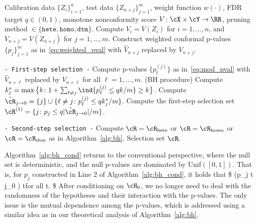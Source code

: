 \begin{algorithm}[h]
  \caption{Hypothesis-conditional Weighted Conformalized Selection}\label{alg:bh_cond}
  \begin{algorithmic}[1]
  \REQUIRE Calibration data $\{Z_i\}_{i=1}^n$,
  test data  $\{Z_{n+j}\}_{j=1}^m$,
  weight function $w(\cdot)$,
  FDR target $q\in(0,1)$, monotone nonconformity score $V\colon \cX\times\cY\to \RR$,
  pruning method $\in\{\texttt{hete}, \texttt{homo}, \texttt{dtm}\}$.
  \vspace{0.05in}
  \STATE Compute $V_i = V(Z_i)$ for $i=1,\dots,n$,
  and $ {V}_{n+j}= V(Z_{n+j})$ for $j=1,\dots,m$.
  \STATE Construct weighted conformal p-values $\{ p_j\}_{j=1}^m$ as in~\eqref{eq:weighted_pval} with $\hat{V}_{n+j}$ replaced by $V_{n+j}$.

  \vspace{0.3em}
  \noindent \texttt{- First-step selection -}
  \STATE Compute p-values $\{ {p}_\ell^{(j)}\}$ as in~\eqref{eq:mod_pval} with $\hat{V}_{n+\ell}$ replaced by $V_{n+\ell}$ for all $\ell=1,\dots,m$.
  \STATE (BH procedure) Compute $k^*_j = \max\big\{k\colon 1 +\sum_{\ell\neq j} \ind\{{p}_\ell^{(j)}\leq qk/m\}\geq k\big\}$.
  \STATE Compute $\hat{\cR}_{j\to 0} = \{j\}\cup\{\ell \neq j\colon  {p}_\ell^{(j)}\leq q k^*_j /m\}$.
  \ENDFOR
  \STATE Compute the first-step selection set $\cR^{(1)} = \{j\colon  {p}_j \leq q|\hat\cR_{j\to 0}|/m\}$.

  \vspace{0.3em}
  \noindent \texttt{- Second-step selection -}
  \STATE Compute $\cR = \cR_{\textrm{hete}}$
  or $\cR = \cR_{\textrm{homo}}$
  or $\cR = \cR_{\textrm{dtm}}$ as in Algorithm~\ref{alg:bh}.
  \vspace{0.05in}
  \ENSURE Selection set $\cR$.
  \end{algorithmic}
\end{algorithm}

Algorithm~\ref{alg:bh_cond} returns to
the conventional perspective, where the null set is
deterministic, and the null p-values
are dominated by Unif$([0,1])$. That is, for $p_j$ constructed
in Line 2 of Algorithm~\ref{alg:bh_cond}, it holds that
\$
\PP(p_j \leq t \given j\in \cH_0 ) \leq t\quad \textrm{for all }t\in[0,1].
\$
After conditioning on $\cH_0$,
we no longer need to deal with the randomness of
the hypotheses  and their interaction with the p-values.
The only issue is the mutual dependence among the p-values,
which is addressed using a similar idea as in our theoretical analysis
of Algorithm~\ref{alg:bh}.

